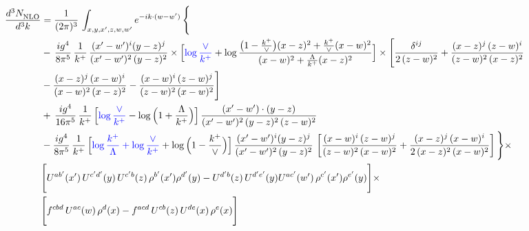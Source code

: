 \documentclass[9pt]{article}
\numberwithin{equation}{section}
\begin{document}
\begin{align}
     \frac{d^{3}N_{\rm NLO}^{\rm}}{d^{3}k}  & =  \frac{1}{(2\pi)^{3}}\, \int_{x,y,x',z,w,w^{\prime}} e^{-ik\cdot (w-w')}\, \Bigg\{\notag \\ & -\,\frac{ig^{4}}{8\pi^{5}}\,\frac{1}{k^{+}}\,\frac{(x'-w')^{i}(y-z)^{j}}{(x'-w')^{2}\,(y-z)^{2}}\times \Big[{\color{blue}\log\frac{\vee}{k^{+}}}+\log\frac{\big(1-\frac{k^{+}}{\vee}\big)(x-z)^{2}+\frac{k^{+}}{\vee}(x-w)^{2}}{(x-w)^{2}+\frac{\Lambda}{k^{+}}(x-z)^{2}}\Big]\times \Bigg[\frac{\delta^{ij}}{2\,(z-w)^{2}}+\frac{(x-z)^{j}\,(z-w)^{i}}{(z-w)^{2}\,(x-z)^{2}}\notag \\ & -\frac{(x-z)^{j}\,(x-w)^{i}}{(x-w)^{2}\,(x-z)^{2}}-\frac{(x-w)^{i}\,(z-w)^{j}}{(z-w)^{2}\,(x-w)^{2}}\Bigg]\notag \\ & +\,\frac{ig^{4}}{16\pi^{5}}\,\frac{1}{k^{+}}\,\Big[{\color{blue}\log\frac{\vee}{k^{+}}}-\log\Big(1+\frac{\Lambda}{k^{+}}\Big)\Big]\, \frac{(x'-w')\cdot (y-z)}{(x'-w')^{2}\,(y-z)^{2}\,(z-w)^{2}}\notag \\ & -\frac{ig^{4}}{8\pi^{5}}\,\frac{1}{k^{+}}\,\Big[{\color{blue}\log\frac{k^{+}}{\Lambda}+\log\frac{\vee}{k^{+}}}+\log\Big(1-\frac{k^{+}}{\vee}\Big)\Big]\,\frac{(x'-w')^{i}(y-z)^{j}}{(x'-w')^{2}\,(y-z)^{2}}\,\left[\frac{(x-w)^{i}\,(z-w)^{j}}{(z-w)^{2}\,(x-w)^{2}}+\frac{(x-z)^{j}\,(x-w)^{i}}{2\,(x-z)^{2}\, (x-w)^{2}}\right]\Bigg\}\times \notag \\ &  \Bigg[U^{ab'}(x')\,U^{c'd'}(y)\,U^{c'b}(z)\,\rho^{b'}(x')\rho^{d'}(y)-U^{d'b}(z)\,U^{d'e'}(y)U^{ac'}(w')\,\rho^{c'}(x')\rho^{e'}(y)\Bigg]\times\notag \\ & \Bigg[f^{cbd}\,U^{ac}(w)\,\rho^{d}(x)-f^{acd}\, U^{cb}(z)\,U^{de}(x)\,\rho^{e}(x)\Bigg] 
\end{align}
\end{document}
